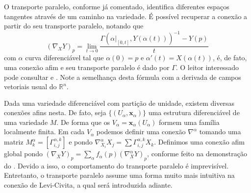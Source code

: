 O transporte paralelo, conforme já comentado, identifica diferentes espaços tangentes através de um caminho na variedade. É possível recuperar a conexão a partir do seu transporte paralelo, notando que
\begin{equation*}
	(\nabla_XY)_{p}=\lim_{ t \to 0 } \frac{\Gamma(\alpha|_{[0,t]},Y(\alpha(t)))^{-1}-Y(p)}{t}
\end{equation*}
com $\alpha$ curva diferenciável tal que $\alpha(0)=p$ e $\alpha'(t)=X(\alpha(t))$, é, de fato, uma conexão afim e seu transporte paralelo é dado por $\Gamma$. O leitor interessado pode consultar \textcite{doCarmo1992} e \textcite{leeRiemannian}.
Note a semelhança desta fórmula com a derivada de campos vetoriais usual do $\mathbb{R}^{n}$.

Dada uma variedade diferenciável com partição de unidade, existem diversas conexões afins nesta. De fato, seja $\{ (U_{\alpha}, \mathbf{x}_{\alpha}) \}$ uma estrutura diferenciável de uma variedade $M$. De forma que os $V_{\alpha}=\mathbf{x}_{\alpha}(U_{\alpha})$ formem uma família localmente finita. Em cada $V_{\alpha}$ podemos definir uma conexão $\nabla^{\alpha}$ tomando uma matriz $M^{\alpha}_{k}=[\Gamma_{i,j}^{\alpha,k}]$ e pondo $\nabla^{\alpha}_{X_{i}}X_{j}=\sum\Gamma_{i,j}^{\alpha,k}X_{k}$. Definimos uma conexão afim global pondo $(\nabla_{X}Y)_{p}=\sum_{\alpha}f_{\alpha}(p)(\nabla_{X}^{\alpha}Y)_{p}$, conforme feito na demonstração do . Devido a isso, o comportamento do transporte paralelo é imprevisível. Entretanto, o transporte paralelo assume uma forma muito mais intuitiva na conexão de Levi-Civita, a qual será introduzida adiante.

